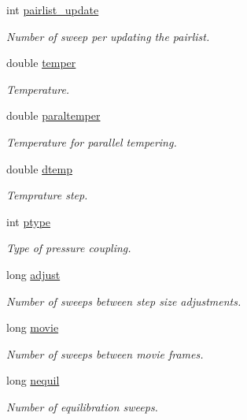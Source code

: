 \begin{DoxyCompactItemize}
int \hyperlink{class_sim_aea1de81852a1210e4b32bb887bbc52e1}{pairlist\+\_\+update}
\begin{DoxyCompactList}\small\item\em Number of sweep per updating the pairlist. \end{DoxyCompactList}\item 
double \hyperlink{class_sim_aa181060fddbb0694234034de7642f56a}{temper}
\begin{DoxyCompactList}\small\item\em Temperature. \end{DoxyCompactList}\item 
double \hyperlink{class_sim_a216b84935ba38ff57f3bd3f13b2c2b20}{paraltemper}
\begin{DoxyCompactList}\small\item\em Temperature for parallel tempering. \end{DoxyCompactList}\item 
double \hyperlink{class_sim_a7eeac7dc978008dbcb58db25672d3e4d}{dtemp}
\begin{DoxyCompactList}\small\item\em Temprature step. \end{DoxyCompactList}\item 
int \hyperlink{class_sim_a85e257bc2ae8a9e328798ddeb776fc3f}{ptype}
\begin{DoxyCompactList}\small\item\em Type of pressure coupling. \end{DoxyCompactList}\item 
long \hyperlink{class_sim_a26476b5125d2eba8af2931d32f8cff12}{adjust}
\begin{DoxyCompactList}\small\item\em Number of sweeps between step size adjustments. \end{DoxyCompactList}\item 
long \hyperlink{class_sim_a8ab1f7bc34f48d81074283f529ee291c}{movie}
\begin{DoxyCompactList}\small\item\em Number of sweeps between movie frames. \end{DoxyCompactList}\item 
long \hyperlink{class_sim_a2bb37396aab56f270fc38442dee52fb1}{nequil}
\begin{DoxyCompactList}\small\item\em Number of equilibration sweeps. \end{DoxyCompactList}\item 

\end{DoxyCompactItemize}
